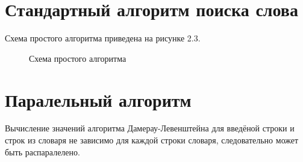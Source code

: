 \documentclass[12pt,a4paper]{report}
\begin{document}
\section{Стандартный алгоритм поиска слова}

Схема простого алгоритма приведена на рисунке 2.3.

\begin{figure}[H] 
    \caption{Схема простого алгоритма}
    \label{fig:image}
\end{figure}

\newpage
\section{Паралельный алгоритм}

Вычисление значений алгоритма Дамерау-Левенштейна для введёной строки и строк из словаря не зависимо для каждой строки словаря, следовательно может быть распаралелено. 
\end{document}
